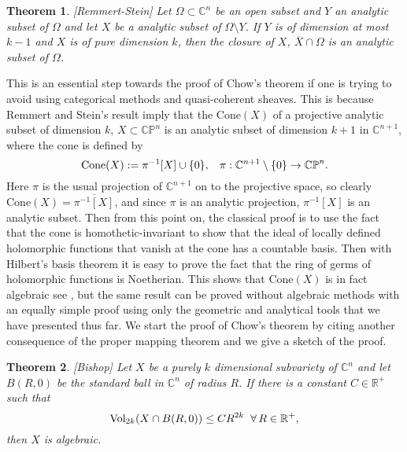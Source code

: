 \documentclass[12pt,twoside,a4paper]{report}
\newtheorem{theorem}{Theorem}[section]
\newcommand{\co}{\ensuremath{\mathbb C }}
\newcommand{\con}{\ensuremath{\mathbb{C}^n}}
\newcommand{\cp}{\ensuremath{\mathbb{CP}}}
\newcommand{\re}{\ensuremath{\mathbb R }}
\begin{document}
\begin{theorem}\label{Rem-Stein}[Remmert-Stein]
        Let $\Omega\subset\con$ be an open subset and $Y$ an analytic subset
        of $\Omega$ and let $X$ be a analytic subset of
        $\Omega\setminus Y$. If $Y$ is of dimension at most $k-1$ and $X$ is of pure dimension $k$,
        then the closure of $X$, $\overline{X}\cap\Omega$ is an analytic subset of $\Omega$.
\end{theorem}
This is an essential step towards the proof of Chow's theorem if one is trying to avoid using categorical methods and
quasi-coherent sheaves. This is because Remmert and Stein's result imply that the $\textrm{Cone}(X)$ of a projective analytic
subset of dimension $k$, $X\subset\cp^n$ is an analytic subset of dimension $k+1$ in $\co^{n+1}$, where the cone is defined by
\begin{equation}
\textrm{Cone}(X):=\pi^{-1}[X]\cup\lbrace0\rbrace,\hspace{0.3cm}\pi:\co^{n+1}\setminus\lbrace 0\rbrace\rightarrow\cp^n.
\end{equation}
\noindent Here $\pi$ is the usual projection of $\co^{n+1}$ on to the
projective space, so clearly $\textrm{Cone}(X)=\overline{\pi^{-1}[X]}$, and since $\pi$
is an analytic projection, $\pi^{-1}[X]$ is an analytic subset. Then from this
point on, the classical proof is to use the fact that the cone is homothetic-invariant to
show that the ideal of locally defined holomorphic functions that vanish at the
cone has a countable basis. Then with Hilbert's basis theorem it is easy to prove the
fact that the ring of germs of holomorphic functions is Noetherian. This shows
that $\textrm{Cone}(X)$ is in fact algebraic see \cite{Chirka}, but the same result can
be proved without algebraic methods with an equally simple proof using only
the geometric and analytical tools that we have presented thus far.  We start
the proof of Chow's theorem by citing another consequence of the proper mapping
theorem and we give a sketch of the proof.
\begin{theorem}\label{bishop}[Bishop]
        Let $X$ be a purely $k$ dimensional subvariety of $\con$ and
        let $B(R,0)$ be the standard ball in $\con$ of
        radius $R$. If there is  a constant $C\in\re^{+}$ such that
        \begin{equation}
                \textrm{Vol}_{2k}(X\cap B(R,0))\leq CR^{2k} \hspace*{0.2cm}\forall\, R\in\re^{+},
        \end{equation} then $X$ is algebraic.
\end{theorem}
\end{document}
